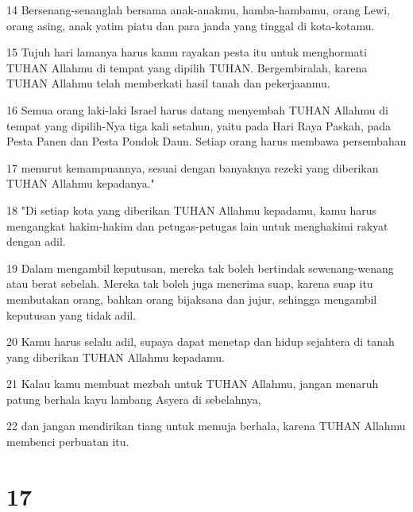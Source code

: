 \par 14 Bersenang-senanglah bersama anak-anakmu, hamba-hambamu, orang Lewi, orang asing, anak yatim piatu dan para janda yang tinggal di kota-kotamu.
\par 15 Tujuh hari lamanya harus kamu rayakan pesta itu untuk menghormati TUHAN Allahmu di tempat yang dipilih TUHAN. Bergembiralah, karena TUHAN Allahmu telah memberkati hasil tanah dan pekerjaanmu.
\par 16 Semua orang laki-laki Israel harus datang menyembah TUHAN Allahmu di tempat yang dipilih-Nya tiga kali setahun, yaitu pada Hari Raya Paskah, pada Pesta Panen dan Pesta Pondok Daun. Setiap orang harus membawa persembahan
\par 17 menurut kemampuannya, sesuai dengan banyaknya rezeki yang diberikan TUHAN Allahmu kepadanya."
\par 18 "Di setiap kota yang diberikan TUHAN Allahmu kepadamu, kamu harus mengangkat hakim-hakim dan petugas-petugas lain untuk menghakimi rakyat dengan adil.
\par 19 Dalam mengambil keputusan, mereka tak boleh bertindak sewenang-wenang atau berat sebelah. Mereka tak boleh juga menerima suap, karena suap itu membutakan orang, bahkan orang bijaksana dan jujur, sehingga mengambil keputusan yang tidak adil.
\par 20 Kamu harus selalu adil, supaya dapat menetap dan hidup sejahtera di tanah yang diberikan TUHAN Allahmu kepadamu.
\par 21 Kalau kamu membuat mezbah untuk TUHAN Allahmu, jangan menaruh patung berhala kayu lambang Asyera di sebelahnya,
\par 22 dan jangan mendirikan tiang untuk memuja berhala, karena TUHAN Allahmu membenci perbuatan itu.

\chapter{17}

